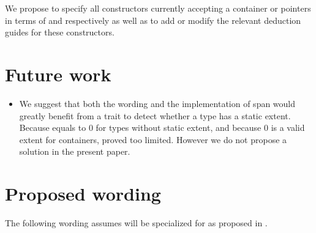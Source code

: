 \documentclass{wg21}
\begin{document}
We propose to specify all constructors currently accepting a container or pointers in terms of  and 
respectively as well as to add or modify the relevant deduction guides for these constructors.

\section{Future work}

\begin{itemize}
	\item We suggest that both the wording and the implementation of span would greatly benefit from a trait to detect whether a type has a static extent.
Because  equals to 0 for types without static extent, and because 0 is a valid extent for containers,  proved too limited. However we do not propose a solution in the present paper.
\end{itemize}

\section{Proposed wording}


The following wording assumes  will be specialized for  as proposed
in \cite{P1474}.  
\end{document}

